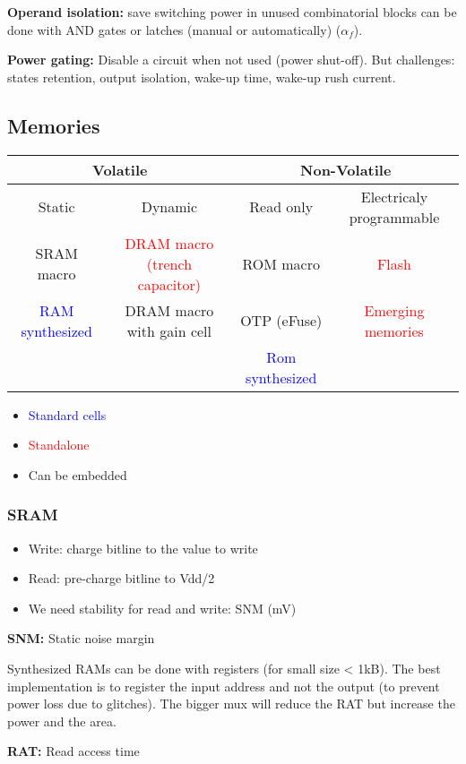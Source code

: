 \textbf{Operand isolation:} save switching power in unused combinatorial blocks can be done with AND gates or latches (manual or automatically) (\(\alpha_f\)).

\textbf{Power gating:} Disable a circuit when not used (power shut-off). But challenges: states retention, output isolation, wake-up time, wake-up rush current.


\subsection{Memories}

\begin{center}
  \begin{tabular}{|c|c|c|c|}
    \hline
    \multicolumn{2}{|c|}{Volatile}&\multicolumn{2}{c|}{Non-Volatile}\\
    \hline
    Static&Dynamic&Read only&Electricaly programmable\\
    \hline
    \hline
    SRAM macro& \textcolor{red}{DRAM macro (trench capacitor)}&ROM macro& \textcolor{red}{Flash}\\
    \hline
  \textcolor{blue}{RAM synthesized}&DRAM macro with gain cell&OTP (eFuse)&\textcolor{red}{Emerging memories}\\
    \hline
&&\textcolor{blue}{Rom synthesized}&\\
    \hline
  \end{tabular}
\end{center}
\begin{itemize}
  \item \textcolor{blue}{Standard cells}
  \item \textcolor{red}{Standalone}
  \item Can be embedded
\end{itemize}

\subsubsection{SRAM}
\begin{itemize}
  \item Write: charge bitline to the value to write
  \item Read: pre-charge bitline to Vdd/2
  \item We need stability for read and write: SNM (mV)
\end{itemize}

\textbf{SNM:} Static noise margin


Synthesized RAMs can be done with registers (for small size < 1kB). The best implementation is to register the input address and not the output (to prevent power loss due to glitches).
\bigbreak
The bigger mux will reduce the RAT but increase the power and the area.

\textbf{RAT:} Read access time



